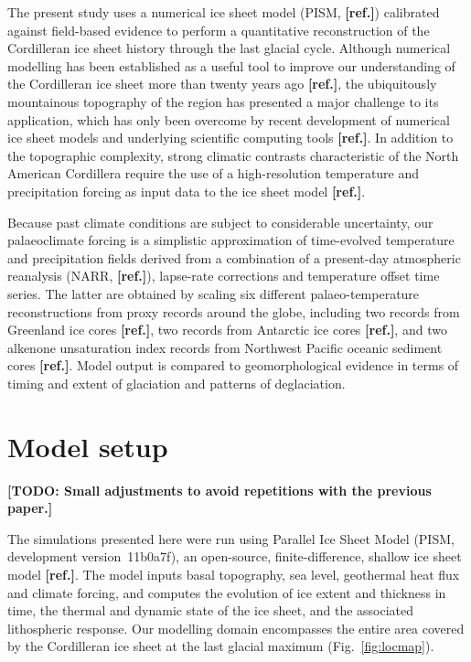 \documentclass[tc, ms]{copernicus}
\newcommand{\todo}[1]{\textbf{[TODO: #1]}}
\newcommand{\aref}[0]{\textbf{[ref.]}}
\begin{document}
The present study uses a numerical ice sheet model (PISM, \aref) calibrated against
field-based evidence to perform a quantitative reconstruction of the
Cordilleran ice sheet history through the last glacial cycle. Although
numerical modelling has been established as a useful tool to improve our
understanding
of the Cordilleran ice sheet more than twenty years ago \aref, the ubiquitously
mountainous topography of the region has presented a major challenge to its
application, which has only been overcome by recent development of numerical ice
sheet models and underlying scientific computing tools \aref. In addition to the topographic
complexity, strong climatic contrasts characteristic of the North American
Cordillera require the use of a high-resolution temperature and precipitation
forcing as input data to the ice sheet model \aref.

Because past climate conditions are subject to considerable uncertainty, our
palaeoclimate forcing is a simplistic approximation of time-evolved temperature
and precipitation fields derived from a combination of a present-day
atmospheric reanalysis (NARR, \aref), lapse-rate corrections and temperature offset
time series. The latter are
obtained by scaling six different palaeo-temperature reconstructions from
proxy records around the globe, including two  records from
Greenland ice cores \aref, two  records from Antarctic ice cores \aref,
and two alkenone unsaturation index records from Northwest Pacific oceanic
sediment cores \aref. Model output is compared to geomorphological evidence in terms
of timing and extent of glaciation and patterns of deglaciation.


\section{Model setup}
\label{sec:model}

\todo{Small adjustments to avoid repetitions with the previous paper.}

The simulations presented here were run using Parallel Ice Sheet Model (PISM,
development version~11b0a7f), an open-source, finite-difference, shallow ice
sheet model \aref. The model inputs basal topography, sea level, geothermal
heat flux and climate forcing, and computes the evolution of ice extent
and thickness in time, the thermal and dynamic state of the ice sheet, and
the associated lithospheric response. Our modelling domain encompasses the
entire area covered by the Cordilleran ice sheet at the last glacial maximum
(Fig.~\ref{fig:locmap}).
\end{document}
